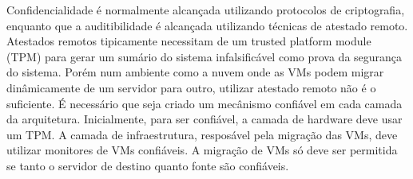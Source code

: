 	Confidencialidade é normalmente alcançada utilizando protocolos de criptografia, enquanto que a auditibilidade é alcançada utilizando técnicas de atestado remoto. Atestados remotos tipicamente necessitam de um trusted platform module (TPM) para gerar um sumário do sistema infalsificável como prova da segurança do sistema. Porém num ambiente como a nuvem onde as VMs podem migrar dinâmicamente de um servidor para outro, utilizar atestado remoto não é o suficiente. É necessário que seja criado um mecânismo confiável em cada camada da arquitetura. Inicialmente, para ser confiável, a camada de hardware deve usar um TPM. A camada de infraestrutura, resposável pela migração das VMs, deve utilizar monitores de VMs confiáveis. A migração de VMs só deve ser permitida se tanto o servidor de destino quanto fonte são confiáveis.


